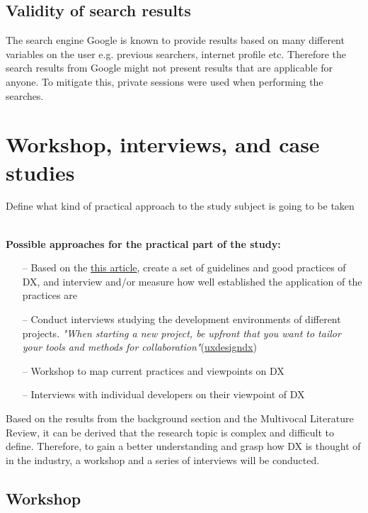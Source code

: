 \documentclass[english, 12pt, a4paper, sci, utf8, a-1b, online]{aaltothesis}
\begin{document}
\subsection{Validity of search results}

The search engine Google is known to provide results based on many different variables on the user e.g. previous searchers, internet profile etc. Therefore the search results from Google might not present results that are applicable for anyone. To mitigate this, private sessions were used when performing the searches.

\clearpage
\section{Workshop, interviews, and case studies}

Define what kind of practical approach to the study subject is going to be taken

\textbf{\\ Possible approaches for the practical part of the study:}

\newcommand{\uxdesigndx}{https://uxdesign.cc/contributing-great-developer-experience-designer-e1f497b0fb4}

\begin{itemize}
  \item [--] Based on the \href{\uxdesigndx}{this article}, create a set of guidelines and good practices of DX, and interview and/or measure how well established the application of the practices are
  \item [--] Conduct interviews studying the development environments of different projects. \textit{"When starting a new project, be upfront that you want to tailor your tools and methods for collaboration"}(\href{\uxdesigndx}{uxdesigndx})
  \item [--] Workshop to map current practices and viewpoints on DX 
  \item [--] Interviews with individual developers on their viewpoint of DX
\end{itemize}

Based on the results from the background section and the Multivocal Literature Review, it can be derived that the research topic is complex and difficult to define. Therefore, to gain a better understanding and grasp how DX is thought of in the industry, a workshop and a series of interviews will be conducted.

\subsection{Workshop}
\end{document}
